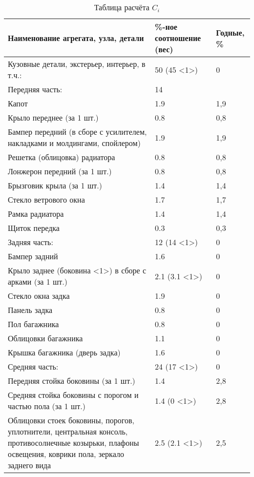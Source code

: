   \begin{longtable}{|p{9cm}|p{4cm}|p{2cm}|}
 	\caption[]{\footnotesize {Таблица расчёта $ C_i $ }}
 	 \label{tab:7}\\
 	 \hline
 	 		Наименование агрегата, узла, детали & \%-ное соотношение (вес)  & Годные, \% \\
 	 		\hline \endhead
 		Кузовные детали, экстерьер, интерьер, в т.ч.: & 50 (45 \textless{}1\textgreater{}) & 0 \\
 		Передняя часть: & 14 &  \\
 		Капот & 1.9 & 1,9 \\
 		Крыло переднее (за 1 шт.) & 0.8 & 0,8 \\
 		Бампер передний (в сборе с усилителем, накладками и молдингами, спойлером) & 1.9 & 1,9 \\
 		Решетка (облицовка) радиатора & 0.8 & 0,8 \\
 		Лонжерон передний (за 1 шт.) & 0.8 & 0,8 \\
 		Брызговик крыла (за 1 шт.) & 1.4 & 1,4 \\
 		Стекло ветрового окна & 1.7 & 1,7 \\
 		Рамка радиатора & 1.4 & 1,4 \\
 		Щиток передка & 0.3 & 0,3 \\
 		Задняя часть: & 12 (14 \textless{}1\textgreater{}) & 0 \\
 		Бампер задний & 1.6 & 0 \\
 		Крыло заднее (боковина \textless{}1\textgreater{}) в сборе с арками (за 1 шт.) & 2.1 (3.1 \textless{}1\textgreater{}) & 0 \\
 		Стекло окна задка & 1.9 & 0 \\
 		Панель задка & 0.8 & 0 \\
 		Пол багажника & 0.8 & 0 \\
 		Облицовки багажника & 1.1 & 0 \\
 		Крышка багажника (дверь задка) & 1.6 & 0 \\
 		Средняя часть: & 24 (17 \textless{}1\textgreater{}) & 0 \\
 		Передняя стойка боковины (за 1 шт.) & 1.4 & 2,8 \\
 		Средняя стойка боковины с порогом и частью пола (за 1 шт.) & 1.4 (0 \textless{}1\textgreater{}) & 2,8 \\
 		Облицовки стоек боковины, порогов, уплотнители, центральная консоль, противосолнечные козырьки, плафоны освещения, коврики пола, зеркало заднего вида & 2.5 (2.1 \textless{}1\textgreater{}) & 2,5 \\

\end{longtable}
